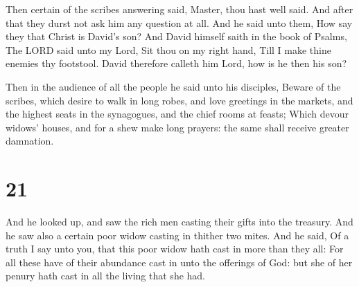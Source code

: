  Then certain of the scribes answering said, Master, thou
hast well said.  And after that they durst not ask him
any question at all.  And he said unto them, How say they
that Christ is David's son?  And David himself saith in
the book of Psalms, The LORD said unto my Lord, Sit thou on my right
hand,  Till I make thine enemies thy footstool.
 David therefore calleth him Lord, how is he then his
son?

 Then in the audience of all the people he said unto his
disciples,  Beware of the scribes, which desire to walk
in long robes, and love greetings in the markets, and the highest seats
in the synagogues, and the chief rooms at feasts;  Which
devour widows' houses, and for a shew make long prayers: the same shall
receive greater damnation.

\hypertarget{section-20}{%
\section{21}\label{section-20}}

 And he looked up, and saw the rich men casting their
gifts into the treasury.  And he saw also a certain poor
widow casting in thither two mites.  And he said, Of a
truth I say unto you, that this poor widow hath cast in more than they
all:  For all these have of their abundance cast in unto
the offerings of God: but she of her penury hath cast in all the living
that she had.

